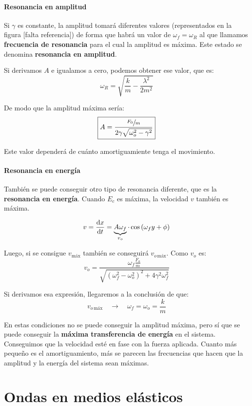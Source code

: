 \documentclass[a4paper]{book}
\numberwithin{figure}{chapter}
\numberwithin{equation}{chapter}
\newcommand{\subtext}[1]{_{\text{#1}}}
\begin{document}
\subsubsection{Resonancia en amplitud}
Si $\gamma$ es constante, la amplitud tomará diferentes valores (representados en la figura [falta referencia]) de forma que habrá un valor de $\omega_f = \omega_R$ al que llamamos \textbf{frecuencia de resonancia} para el cual la amplitud es máxima. Este estado se denomina \textbf{resonancia en amplitud}.

Si derivamos $A$ e igualamos a cero, podemos obtener ese valor, que es:
\[\boxed{\omega_R = \sqrt{\frac{k}{m}-\frac{\lambda^2}{2m^2}}}\]

De modo que la amplitud máxima sería:
\[\boxed{A = \frac{\sfrac{F_0}{m}}{2\gamma \sqrt{\omega_o^2-\gamma^2}}}\]

Este valor dependerá de cuánto amortiguamiente tenga el movimiento.

\subsubsection{Resonancia en energía}
También se puede conseguir otro tipo de resonancia diferente, que es la \textbf{resonancia en energía}. Cuando $E_c$ es máxima, la velocidad $v$ también es máxima.

\[v=\dv{x}{t} = \underbrace{A\omega_f}_{v_o}\cdot \cos\left( \omega_fy + \phi \right)\]

Luego, si se consigue $v\subtext{máx}$ también se conseguirá
$v_{o\, \text{máx}}$. Como $v_o$ es:
\[v_o = \frac{\omega_f\frac{F_o}{m}}{\sqrt{\left( \omega_f^2-\omega_o^2 \right)^2+4\gamma^2\omega_f^2}}\]

Si derivamos esa expresión, llegaremos a la conclusión de que:
\[v_{o\,  \text{máx}}\quad \longrightarrow \quad \boxed{\omega_f=\omega_o = \frac{k}{m}}\]

En estas condiciones no se puede conseguir la amplitud máxima, pero sí que se puede conseguir la \textbf{máxima transferencia de energía} en el sistema. Conseguimos que la velocidad esté en fase con la fuerza aplicada. Cuanto más pequeño es el amortiguamiento, más se parecen las frecuencias que hacen que la amplitud y la energía del sistema sean máximas.



\chapter{Ondas en medios elásticos}
\end{document}
